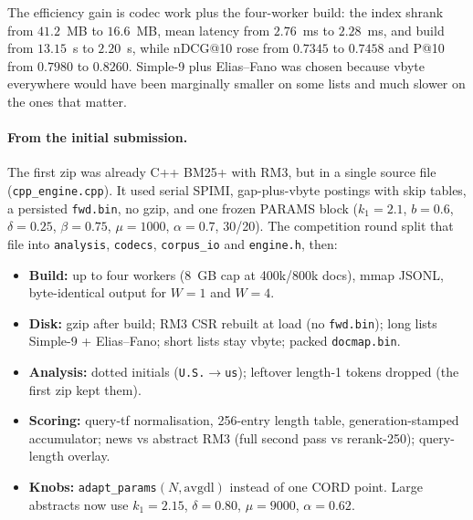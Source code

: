 \documentclass[10pt,a4paper]{article}
\begin{document}
The efficiency gain is codec work plus the four-worker build: the index shrank
from $41.2$~MB to $16.6$~MB, mean latency from $2.76$~ms to $2.28$~ms, and build
from $13.15$~s to $2.20$~s, while nDCG@10 rose from $0.7345$ to $0.7458$ and P@10
from $0.7980$ to $0.8260$.
Simple-9 plus Elias--Fano was chosen because vbyte everywhere would have been
marginally smaller on some lists and much slower on the ones that matter.

\paragraph{From the initial submission.}
The first zip was already C++ BM25+ with RM3, but in a single source file
(\texttt{cpp\_engine.cpp}). It used serial SPIMI, gap-plus-vbyte postings with skip
tables, a persisted \texttt{fwd.bin}, no gzip, and one frozen PARAMS block
($k_1{=}2.1$, $b{=}0.6$, $\delta{=}0.25$, $\beta{=}0.75$, $\mu{=}1000$,
$\alpha{=}0.7$, 30/20). The competition round split that file into
\texttt{analysis}, \texttt{codecs}, \texttt{corpus\_io} and \texttt{engine.h}, then:
\begin{itemize}
  \item \textbf{Build:} up to four workers (8~GB cap at 400k/800k docs), mmap JSONL,
        byte-identical output for $W{=}1$ and $W{=}4$.
  \item \textbf{Disk:} gzip after build; RM3 CSR rebuilt at load (no
        \texttt{fwd.bin}); long lists Simple-9 + Elias--Fano; short lists stay vbyte;
        packed \texttt{docmap.bin}.
  \item \textbf{Analysis:} dotted initials (\texttt{U.S.}$\to$\texttt{us}); leftover
        length-1 tokens dropped (the first zip kept them).
  \item \textbf{Scoring:} query-tf normalisation, 256-entry length table,
        generation-stamped accumulator; news vs abstract RM3 (full second pass vs
        rerank-250); query-length overlay.
  \item \textbf{Knobs:} \texttt{adapt\_params}$(N,\mathrm{avgdl})$ instead of one
        CORD point. Large abstracts now use $k_1{=}2.15$, $\delta{=}0.80$,
        $\mu{=}9000$, $\alpha{=}0.62$.
\end{itemize}
\end{document}
